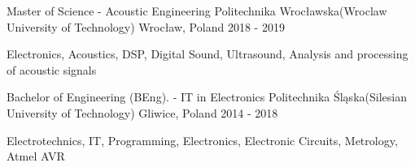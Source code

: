

\begin{cventries}

  \cventry
    {Master of Science - Acoustic Engineering} %
    {Politechnika Wrocławska(Wroclaw University of Technology)} %
    {Wrocław, Poland} %
    {2018 - 2019} %
    {
      \begin{cvitems} %
        \item {Electronics, Acoustics, DSP, Digital Sound, Ultrasound, Analysis and processing of acoustic signals}
      \end{cvitems}
    }

  \cventry
    {Bachelor of Engineering (BEng). - IT in Electronics} %
    {Politechnika Śląska(Silesian University of Technology)} %
    {Gliwice, Poland} %
    {2014 - 2018} %
    {
      \begin{cvitems} %
        \item {Electrotechnics, IT, Programming, Electronics, Electronic Circuits, Metrology, Atmel AVR}
      \end{cvitems}
    }

\end{cventries}
